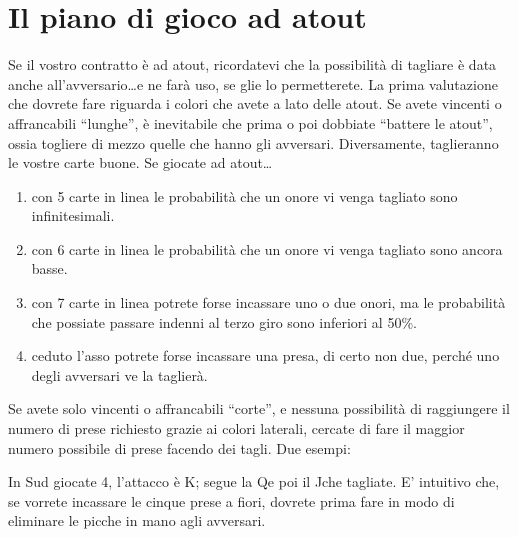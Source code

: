 \documentclass[../corsofiori.tex]{subfiles}
\begin{document}
\chapter{Il piano di gioco ad atout}
Se il vostro contratto è ad atout, ricordatevi che la possibilità di tagliare è data anche all’avversario\ldots e ne farà
uso, se glie lo permetterete. La prima valutazione che dovrete fare riguarda i colori che avete a lato delle atout.  Se
avete vincenti o affrancabili “lunghe”, è inevitabile che prima o poi dobbiate “battere le atout”, ossia togliere di
mezzo quelle che hanno gli avversari.  Diversamente, taglieranno le vostre carte buone. Se giocate ad atout\ldots

\medskip
\hfill
{}
\hfill
{}\hfill
{}\hfill
{}\hfill
\medskip

\begin{enumerate}[label=\protect\numcircledtikz{\small\arabic*}]
 \item con 5 carte in linea le probabilità che un onore vi venga tagliato sono infinitesimali.
 \item con 6 carte in linea le probabilità che un onore vi venga tagliato sono ancora basse.
 \item con 7 carte in linea potrete forse incassare uno o due onori, ma le probabilità che possiate passare indenni al
     terzo giro sono inferiori al 50\%.
\item ceduto l’asso potrete forse incassare una presa, di certo non due, perché uno degli avversari ve la taglierà.
\end{enumerate}

Se avete solo vincenti o affrancabili “corte”, e nessuna possibilità di raggiungere
il numero di prese richiesto grazie ai colori laterali, cercate di fare il maggior numero
possibile di prese facendo dei tagli. Due esempi:

\newgame
{}
\leftupper{\boardtext*}%
{\dealertext\quad}{\vulnertext}

\showAll*

In Sud giocate 4\Sp, l’attacco è K\Di; segue la Q\Di e poi il J\Di che tagliate. E’ intuitivo che, se vorrete incassare
le cinque prese a fiori, dovrete prima fare in modo di eliminare le picche in mano agli avversari.
\end{document}
